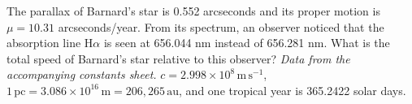 The parallax of Barnard's star is 0.552 arcseconds and its proper motion is $\mu=10.31$ arcseconds/year.
From its spectrum, an observer noticed that the absorption line H$\alpha$ is seen at 656.044 nm instead
of 656.281 nm. What is the total speed of Barnard's star relative to this observer?
\textit{Data from the accompanying constants sheet.}
$c=2.998\times10^8\,\mathrm{m\,s^{-1}}$, $1\,\mathrm{pc}=3.086\times10^{16}\,\mathrm{m}=206{,}265\,\mathrm{au}$,
and one tropical year is 365.2422 solar days.
